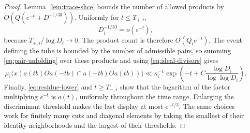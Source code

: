 \begin{proof}
Lemma~\ref{lem:trace-slice} bounds the number of allowed products
by $O(Q(e^{-t}+D^{-1/30}))$.  Uniformly for $t\le T_{+,i}$,
\[
 D_i^{-1/30}=o(e^{-t}),
\]
because $T_{+,i}/\log D_i\to0$.  The product count is therefore
$O(Q_i e^{-t})$.  The event defining the tube is bounded by the
number of admissible pairs, so summing \eqref{eq:pair-unfolding}
over these products and using \eqref{eq:ideal-divisors} gives
\[
 \mu_i\bigl(x(a(tb)Oa(-tb)\cap a(-tb)Oa(tb))\bigr)
 \ll\kappa_i^{-1}
      \exp\left(-t+C\frac{\log D_i}{\log\log D_i}\right).
\]
Finally, \eqref{eq:residue-lower} and $t\ge T_{-,i}$ show that
the logarithm of the factor multiplying $e^{-t}$ is $o(t)$,
uniformly throughout the time range.  Enlarging the discriminant
threshold makes the last display at most $e^{-t/3}$.
The same choices work for finitely many cuts and diagonal elements
by taking the smallest of their identity neighborhoods and the
largest of their thresholds.
\end{proof}
